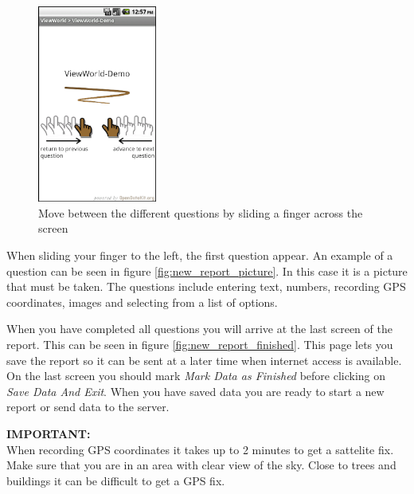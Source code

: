 \documentclass[a4paper, 12pt, final]{article}
\begin{document}
\begin{figure}[H]
  \centering
      \includegraphics[width=0.35\textwidth]{pics/new_report_first_screen.png}
  \caption{Move between the different questions by sliding a finger across the screen}
  \label{fig:new_report_first_screen}
\end{figure}

When sliding your finger to the left, the first question appear. An example of a question can be seen in figure \ref{fig:new_report_picture}. In this case it is a picture that must be taken. The questions include entering text, numbers, recording GPS coordinates, images and selecting from a list of options.

When you have completed all questions you will arrive at the last screen of the report. This can be seen in figure \ref{fig:new_report_finished}. This page lets you save the report so it can be sent at a later time when internet access is available. On the last screen you should mark \emph{Mark Data as Finished} before clicking on \emph{Save Data And Exit}.
When you have saved data you are ready to start a new report or send data to the server.

\vspace{0.5cm}
\begin{boxedminipage}{\textwidth}
\textbf{IMPORTANT:}\\When recording GPS coordinates it takes up to 2 minutes to get a sattelite fix. Make sure that you are in an area with clear view of the sky. Close to trees and buildings it can be difficult to get a GPS fix.
\end{boxedminipage}
\end{document}
